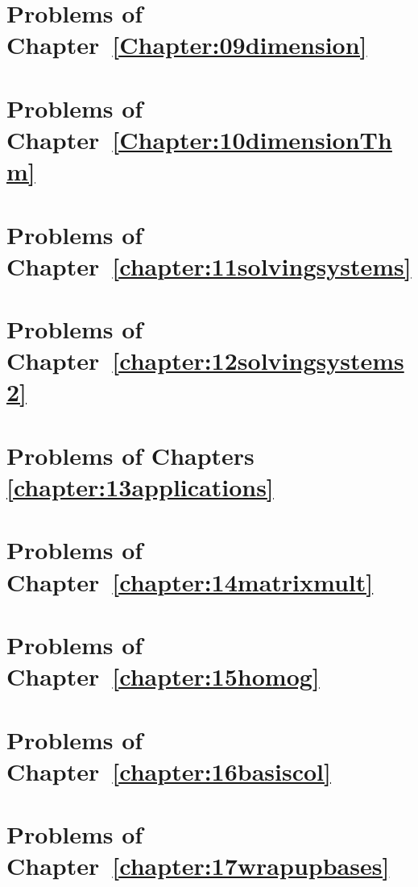  

\section*{Problems of Chapter~\ref{Chapter:09dimension}}


\section*{Problems of Chapter~\ref{Chapter:10dimensionThm}}


\section*{Problems of Chapter~\ref{chapter:11solvingsystems}}
 

\section*{Problems of Chapter~\ref{chapter:12solvingsystems2}} 





\section*{Problems of Chapters~ \ref{chapter:13applications}}

%
 
\section*{Problems of Chapter~\ref{chapter:14matrixmult}}  


\section*{Problems of Chapter~\ref{chapter:15homog}}  



\section*{Problems of Chapter~\ref{chapter:16basiscol}} 
 

\section*{Problems of Chapter~\ref{chapter:17wrapupbases}}  


